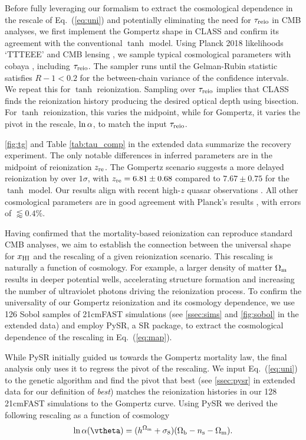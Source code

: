 Before fully leveraging our formalism to extract the cosmological
dependence in the rescale of Eq.~(\ref{eq:uni}) and potentially
eliminating the need for $\tau_{\mathrm{reio}}$ in CMB analyses, we first
implement the Gompertz shape in CLASS and confirm its agreement with the
conventional $\tanh$ model.
Using Planck 2018 likelihoods `TTTEEE' \cite{Planck2020c} and CMB
lensing \cite{Planck2020d}, we sample typical cosmological parameters
with cobaya \cite{Torrado2020}, including $\tau_{\mathrm{reio}}$.
The sampler runs until the Gelman-Rubin statistic \cite{Lewis2013}
satisfies $R - 1 < 0.2$ for the between-chain variance of the confidence
intervals.
We repeat this for $\tanh$ reionization.
Sampling over $\tau_{\mathrm{reio}}$ implies that CLASS finds the reionization
history producing the desired optical depth using bisection.
For $\tanh$ reionization, this varies the midpoint, while for Gompertz,
it varies the pivot in the rescale, $\ln\alpha$, to match the input
$\tau_{\mathrm{reio}}$.

\autoref{fig:tg} and Table \ref{tab:tau_comp} in the extended data
summarize the recovery experiment.
The only notable differences in inferred parameters are in the midpoint
of reionization $z_{\mathrm{re}}$.
The Gompertz scenario suggests a more delayed reionization by over
$1\sigma$, with $z_{\mathrm{re}} = 6.81 \pm 0.68$ compared to $7.67 \pm 0.75$ for
the $\tanh$ model.
Our results align with recent high-$z$ quasar observations
\cite{Keating2020}.
All other cosmological parameters are in good agreement with Planck's
results \cite{Planck2020a}, with errors of $\lessapprox 0.4 \%$.

Having confirmed that the mortality-based reionization can reproduce
standard CMB analyses, we aim to establish the connection between the
universal shape for $x_{\mathrm{HI}}$ and the rescaling of  a given reionization
scenario.
This rescaling is naturally a function of cosmology.
For example, a larger density of matter $\Omega_\mathrm{m}$ results in deeper
potential wells, accelerating structure formation and increasing the
number of ultraviolet photons driving the reionization process.
To confirm the universality of our Gompertz reionization and its
cosmology dependence, we use 126 Sobol samples of 21cmFAST simulations
(see \ref{ssec:sims} and \autoref{fig:sobol} in the extended data)
and employ PySR, a SR package, to extract the cosmological dependence of
the rescaling in Eq.~(\ref{eq:map}).

While PySR initially guided us towards the Gompertz mortality law, the
final analysis only uses it to regress the pivot of the rescaling.
We input Eq.~(\ref{eq:uni}) to the genetic algorithm and find the pivot
that best (see \ref{ssec:pysr} in extended data for our definition of
\emph{best}) matches the reionization histories in our 128 21cmFAST
simulations to the Gompertz curve.
Using PySR we derived the following rescaling as a function of cosmology
%
\begin{equation}
\label{eq:SR}
\ln\ap(\vtheta) = (h^{\Omegam} + \sigma_8) (\Omegab - \ns - \Omegam).
\end{equation}

